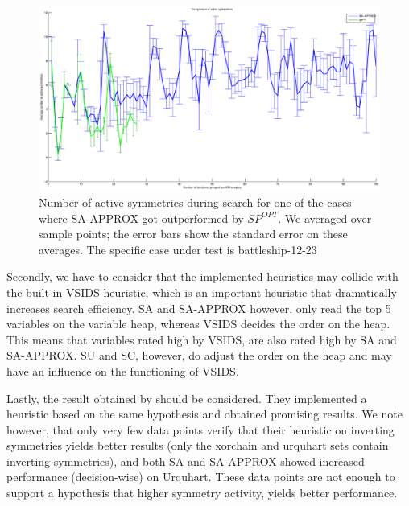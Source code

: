 	\begin{figure}[!ht]
		\center
		\centerline{\includegraphics[width=1.2\textwidth]{results/battleship-12-23-approx-vs-reg.eps}}
		\caption{
			Number of active symmetries during search for one of the cases where SA-APPROX got
			outperformed by $SP^{OPT}$.
			We averaged over sample points; the error bars show the standard error on these
			averages.
			The specific case under test is battleship-12-23
		}
		\label{fig:active_symmetries_during_search}
	\end{figure}

	Secondly, we have to consider that the implemented heuristics may collide with the built-in
	VSIDS heuristic, which is an important heuristic that dramatically increases search efficiency.
	SA and SA-APPROX however, only read the top 5 variables on the variable heap, whereas VSIDS
	decides the order on the heap.
	This means that variables rated high by VSIDS, are also rated high by SA and SA-APPROX.
	SU and SC, however, do adjust the order on the heap and may have an influence on the functioning of VSIDS.

	Lastly, the result obtained by \cite{devriendt2012symmetry} should be considered.
	They implemented a heuristic based on the same hypothesis and obtained promising results.
	We note however, that only very few data points verify that their heuristic on inverting symmetries
	yields better results (only the xorchain and urquhart sets contain inverting symmetries), and
	both SA and SA-APPROX showed increased performance (decision-wise) on Urquhart.
	These data points are not enough to support a hypothesis that higher symmetry activity, yields
	better performance.
